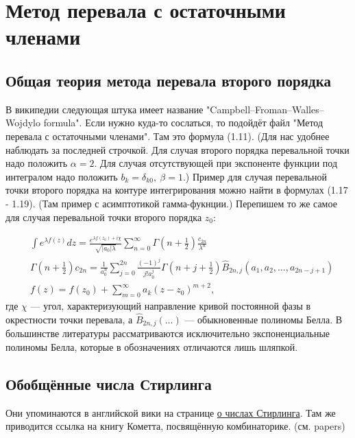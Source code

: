 \documentclass[a4paper, 12pt]{article}
\begin{document}
\section*{Метод перевала с остаточными членами}
\subsection*{Общая теория метода перевала второго порядка}
В википедии следующая штука имеет название "Campbell–Froman–Walles–Wojdylo formula". Если нужно куда-то сослаться, то подойдёт файл "Метод перевала с остаточными членами". Там это формула (1.11). (Для нас удобнее наблюдать за последней строчкой. Для случая второго порядка перевальной точки надо положить $\alpha=2$. Для случая отсутствующей при экспоненте функции под интегралом надо положить $b_k = \delta_{k0}, \: \beta = 1$.) Пример для случая перевальной точки второго порядка на контуре интегрирования можно найти в формулах (1.17 - 1.19). (Там пример с асимптотикой гамма-фукнции.) Перепишем то же самое для случая перевальной точки второго порядка $z_0$:

\begin{equation}\label{steepest_decent}
\begin{aligned}
    &\int e^{\lambda f(z)} dz = \frac{e^{\lambda f(z_0)+i\chi}}{\sqrt{|a_0|\lambda}}\sum\limits_{n=0}^{\infty} \Gamma\left(n+\frac{1}{2}\right)\frac{c_{2n}}{\lambda^n} \\ 
    & \Gamma\left(n+\frac{1}{2}\right) c_{2n}= \frac{1}{a_0^n}\sum\limits_{j=0}^{2n}\frac{(-1)^j}{j! a_0^j} \Gamma\left(n+j+\frac{1}{2}\right) \hat{B}_{2n, j}\left(a_1, a_2, \dots, a_{2n-j+1}\right) \\
    & f(z) = f(z_0) + \sum\limits_{m=0}^{\infty} a_k (z-z_0)^{m+2},
\end{aligned}
\end{equation}
где $\chi$ --- угол, характеризующий направление кривой постоянной фазы в окрестности точки перевала, а $\hat{B}_{2n, j}\left(\dots\right)$ --- обыкновенные полиномы Белла. В большинстве литературы рассматриваются исключительно экспоненциальные полиномы Белла, которые в обозначениях отличаются лишь шляпкой.
\subsection*{Обобщённые числа Стирлинга}
Они упоминаются в английской вики на странице \href{https://en.wikipedia.org/wiki/Stirling_numbers_of_the_second_kind}{о числах Стирлинга}. Там же приводится ссылка на книгу Кометта, посвящённую комбинаторике. (см. papers)
\end{document}
